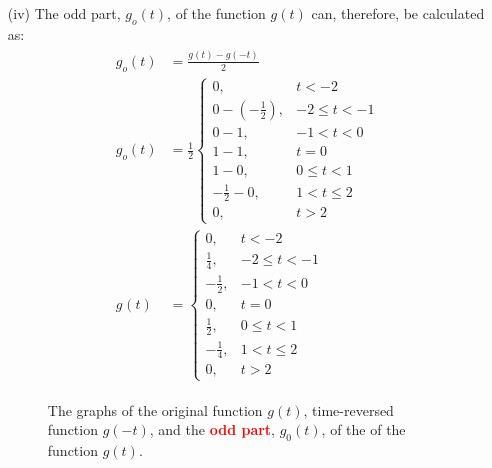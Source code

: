 \documentclass[a4paper, 12pt]{article}
\begin{document}
\begin{itemize}
\begin{itemize}
\begin{itemize}
\begin{figure}[h!]
\end{figure}
\item[(iv)]{The odd part, $g_{o}(t)$, of the function $g(t)$ can, therefore, be calculated as:}
\begin{equation}
\begin{gathered}
\begin{alignedat}{1}
g_{o}(t) & = \frac{g(t) - g(-t)}{2} \\
g_{o}(t) & = \frac{1}{2}
\begin{cases}
0, & t < -2 \\
0- \left( - \frac{1}{2} \right), & -2 \leq t < -1 \\
0 - 1, & -1 < t < 0 \\
1 - 1, & t = 0 \\
1 - 0, & 0 \leq t < 1 \\
-\frac{1}{2} - 0, & 1 < t \leq 2 \\
0, & t > 2
\end{cases} \\
g_{}(t) & = 
\begin{cases}
0, & t < -2 \\
\frac{1}{4}, & -2 \leq t < -1 \\
- \frac{1}{2}, & -1 < t < 0 \\
0, & t = 0 \\
\frac{1}{2} , & 0 \leq t < 1 \\
-\frac{1}{4}, & 1 < t \leq 2 \\
0, & t > 2
\end{cases}
\end{alignedat} 
\end{gathered}
\end{equation}
\begin{figure}[h!]
\caption{The graphs of the original function $g(t)$, time-reversed function $g(-t)$, and the \textcolor{red}{\textbf{odd part}}, $g_{0}(t)$, of the of the function $g(t)$.}
\end{figure}
\end{itemize}


\end{itemize}
\end{itemize}
\end{document}
